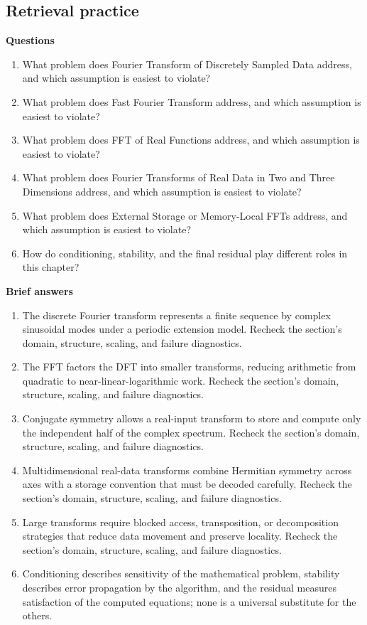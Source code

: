 \documentclass[10pt,letterpaper]{article}
\begin{document}
\subsection*{Retrieval practice}
\textbf{Questions}
\begin{enumerate}
\item What problem does Fourier Transform of Discretely Sampled Data address, and which assumption is easiest to violate?
\item What problem does Fast Fourier Transform address, and which assumption is easiest to violate?
\item What problem does FFT of Real Functions address, and which assumption is easiest to violate?
\item What problem does Fourier Transforms of Real Data in Two and Three Dimensions address, and which assumption is easiest to violate?
\item What problem does External Storage or Memory-Local FFTs address, and which assumption is easiest to violate?
\item How do conditioning, stability, and the final residual play different roles in this chapter?
\end{enumerate}

\textbf{Brief answers}
\begin{enumerate}
\item The discrete Fourier transform represents a finite sequence by complex sinusoidal modes under a periodic extension model. Recheck the section's domain, structure, scaling, and failure diagnostics.
\item The FFT factors the DFT into smaller transforms, reducing arithmetic from quadratic to near-linear-logarithmic work. Recheck the section's domain, structure, scaling, and failure diagnostics.
\item Conjugate symmetry allows a real-input transform to store and compute only the independent half of the complex spectrum. Recheck the section's domain, structure, scaling, and failure diagnostics.
\item Multidimensional real-data transforms combine Hermitian symmetry across axes with a storage convention that must be decoded carefully. Recheck the section's domain, structure, scaling, and failure diagnostics.
\item Large transforms require blocked access, transposition, or decomposition strategies that reduce data movement and preserve locality. Recheck the section's domain, structure, scaling, and failure diagnostics.
\item Conditioning describes sensitivity of the mathematical problem, stability describes error propagation by the algorithm, and the residual measures satisfaction of the computed equations; none is a universal substitute for the others.
\end{enumerate}
\end{document}
